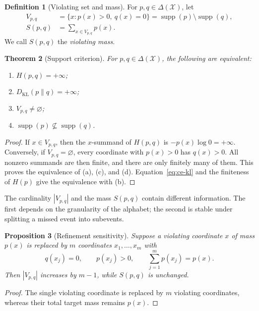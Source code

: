\documentclass[11pt,a4paper]{article}
\newtheorem{theorem}{Theorem}[section]
\newtheorem{proposition}[theorem]{Proposition}
\theoremstyle{definition}
\newtheorem{definition}[theorem]{Definition}
\theoremstyle{remark}
\newcommand{\supp}{\operatorname{supp}}
\newcommand{\KL}{D_{\mathrm{KL}}}
\newcommand{\simplex}{\Delta(\mathcal X)}
\begin{document}
\begin{definition}[Violating set and mass]
For $p,q\in\simplex$, let
\begin{align}
  V_{p,q}
    &= \{x:p(x)>0,\ q(x)=0\}
     = \supp(p)\setminus\supp(q), \\
  S(p,q)
    &= \sum_{x\in V_{p,q}}p(x).
\end{align}
We call $S(p,q)$ the \emph{violating mass}.
\end{definition}

\begin{theorem}[Support criterion]
\label{thm:support}
For $p,q\in\simplex$, the following are equivalent:
\begin{enumerate}[label=(\alph*)]
  \item $H(p,q)=+\infty$;
  \item $\KL(p\|q)=+\infty$;
  \item $V_{p,q}\neq\varnothing$;
  \item $\supp(p)\not\subseteq\supp(q)$.
\end{enumerate}
\end{theorem}

\begin{proof}
If $x\in V_{p,q}$, then the $x$-summand of $H(p,q)$ is $-p(x)\log0=+\infty$.
Conversely, if $V_{p,q}=\varnothing$, every coordinate with $p(x)>0$ has $q(x)>0$.
All nonzero summands are then finite, and there are only finitely many of them.
This proves the equivalence of (a), (c), and (d).
Equation~\eqref{eq:ce-kl} and the finiteness of $H(p)$ give the equivalence with (b).
\end{proof}

The cardinality $|V_{p,q}|$ and the mass $S(p,q)$ contain different information.
The first depends on the granularity of the alphabet; the second is stable under splitting a missed event into subevents.

\begin{proposition}[Refinement sensitivity]
\label{prop:refinement}
Suppose a violating coordinate $x$ of mass $p(x)$ is replaced by $m$ coordinates $x_1,\dots,x_m$ with
\[
  q(x_j)=0,
  \qquad
  p(x_j)>0,
  \qquad
  \sum_{j=1}^m p(x_j)=p(x).
\]
Then $|V_{p,q}|$ increases by $m-1$, while $S(p,q)$ is unchanged.
\end{proposition}

\begin{proof}
The single violating coordinate is replaced by $m$ violating coordinates, whereas their total target mass remains $p(x)$.
\end{proof}
\end{document}

